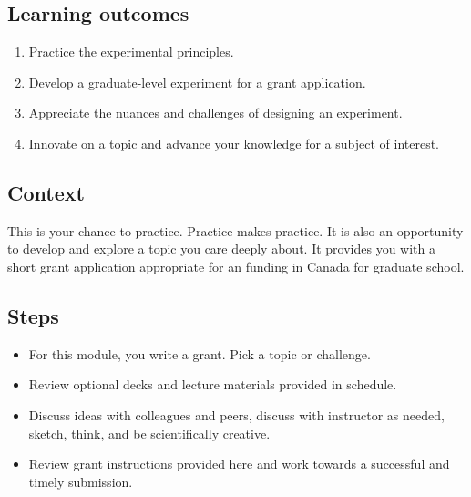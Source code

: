 \documentclass[
]{book}
\providecommand{\tightlist}{%
  \setlength{\itemsep}{0pt}\setlength{\parskip}{0pt}}
\begin{document}
\hypertarget{learning-outcomes-2}{%
\subsection*{Learning outcomes}\label{learning-outcomes-2}}

\begin{enumerate}
\def\labelenumi{\arabic{enumi}.}
\tightlist
\item
  Practice the experimental principles.
\item
  Develop a graduate-level experiment for a grant application.\\
\item
  Appreciate the nuances and challenges of designing an experiment.\\
\item
  Innovate on a topic and advance your knowledge for a subject of interest.
\end{enumerate}

\hypertarget{context-1}{%
\subsection*{Context}\label{context-1}}

This is your chance to practice. Practice makes practice. It is also an opportunity to develop and explore a topic you care deeply about. It provides you with a short grant application appropriate for an funding in Canada for graduate school.

\hypertarget{steps-1}{%
\subsection*{Steps}\label{steps-1}}

\begin{itemize}
\tightlist
\item
  For this module, you write a grant. Pick a topic or challenge.\\
\item
  Review optional decks and lecture materials provided in schedule.\\
\item
  Discuss ideas with colleagues and peers, discuss with instructor as needed, sketch, think, and be scientifically creative.\\
\item
  Review grant instructions provided here and work towards a successful and timely submission.
\end{itemize}
\end{document}

